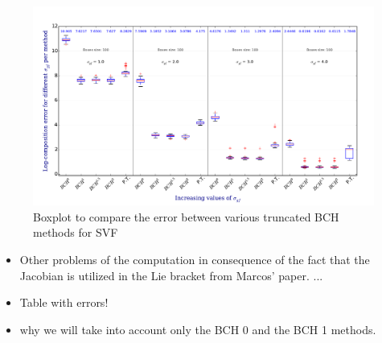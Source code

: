\begin{figure}[!ht]
	\hspace{-0.5cm}
	\includegraphics[scale=0.5]{figures/SVF_boxplot_comparisons_BCH.pdf}
	\caption{Boxplot to compare the error between various truncated BCH methods for SVF}
	\label{fig:SVF_boxplot_comparisons_BCH}
\end{figure}

\begin{itemize}
	\item Other problems of the computation in consequence of the fact that the Jacobian is utilized in the Lie bracket from Marcos' paper. ...
	\item Table with errors!
	\item why we will take into account only the BCH 0 and the BCH 1 methods.
\end{itemize}




\newpage

%
%
%
%
%
%


\newpage

